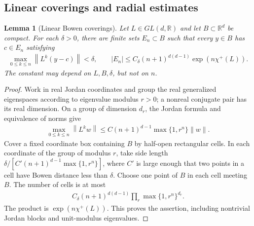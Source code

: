 \documentclass[11pt,a4paper]{article}
\newtheorem{lemma}[theorem]{Lemma}
\theoremstyle{definition}
\theoremstyle{remark}
\begin{document}
\subsection{Linear coverings and radial estimates}

\begin{lemma}[Linear Bowen coverings]\label{lem:matrix}
Let \(L\in GL(d,\mathbb R)\) and let \(B\subset\mathbb R^d\) be compact. For each \(\delta>0\), there are finite sets \(E_n\subset B\) such that every \(y\in B\) has \(c\in E_n\) satisfying
\begin{align*}
 \max_{0\leq k\leq n}\left\lVert L^k(y-c)\right\rVert<\delta,
 \qquad
 |E_n|\leq C_\delta(n+1)^{d(d-1)}
                 \exp(n\chi^+(L)).
\end{align*}
The constant may depend on \(L,B,\delta\), but not on \(n\).
\end{lemma}
\begin{proof}
Work in real Jordan coordinates and group the real generalized eigenspaces according to eigenvalue modulus \(r>0\); a nonreal conjugate pair has its real dimension. On a group of dimension \(d_r\), the Jordan formula and equivalence of norms give
\begin{align*}
 \max_{0\leq k\leq n}\left\lVert L^kw\right\rVert
 \leq C(n+1)^{d-1}\max\{1,r^n\}\lVert w\rVert.
\end{align*}
Cover a fixed coordinate box containing \(B\) by half-open rectangular cells. In each coordinate of the group of modulus \(r\), take side length
\(\delta/[C'(n+1)^{d-1}\max\{1,r^n\}]\), where \(C'\) is large enough that two points in a cell have Bowen distance less than \(\delta\). Choose one point of \(B\) in each cell meeting \(B\). The number of cells is at most
\begin{align*}
 C_\delta(n+1)^{d(d-1)}
 \prod_r\max\{1,r^n\}^{d_r}.
\end{align*}
The product is \(\exp(n\chi^+(L))\). This proves the assertion, including nontrivial Jordan blocks and unit-modulus eigenvalues.
\end{proof}
\end{document}

